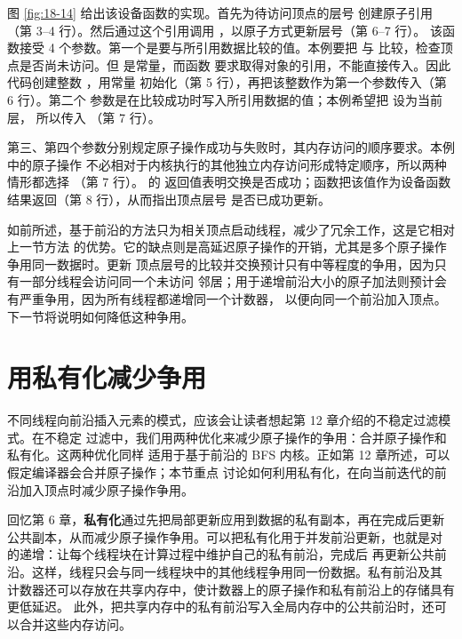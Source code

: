 图 \ref{fig:18-14} 给出该设备函数的实现。首先为待访问顶点的层号
 创建原子引用（第 3--4 行）。然后通过这个引用调用
，以原子方式更新层号（第 6--7 行）。
该函数接受 4 个参数。第一个是要与所引用数据比较的值。本例要把 
与  比较，检查顶点是否尚未访问。但  是常量，而函数
要求取得对象的引用，不能直接传入。因此代码创建整数 ，用常量
 初始化（第 5 行），再把该整数作为第一个参数传入（第 6 行）。第二个
参数是在比较成功时写入所引用数据的值；本例希望把  设为当前层，
所以传入 （第 7 行）。

第三、第四个参数分别规定原子操作成功与失败时，其内存访问的顺序要求。本例中的原子操作
不必相对于内核执行的其他独立内存访问形成特定顺序，所以两种情形都选择
（第 7 行）。 的
返回值表明交换是否成功；函数把该值作为设备函数结果返回（第 8 行），从而指出顶点层号
是否已成功更新。

如前所述，基于前沿的方法只为相关顶点启动线程，减少了冗余工作，这是它相对上一节方法
的优势。它的缺点则是高延迟原子操作的开销，尤其是多个原子操作争用同一数据时。更新
顶点层号的比较并交换预计只有中等程度的争用，因为只有一部分线程会访问同一个未访问
邻居；用于递增前沿大小的原子加法则预计会有严重争用，因为所有线程都递增同一个计数器，
以便向同一个前沿加入顶点。下一节将说明如何降低这种争用。

\section{用私有化减少争用}
\label{sec:bfs-privatization}

不同线程向前沿插入元素的模式，应该会让读者想起第 12 章介绍的不稳定过滤模式。在不稳定
过滤中，我们用两种优化来减少原子操作的争用：合并原子操作和私有化。这两种优化同样
适用于基于前沿的 BFS 内核。正如第 12 章所述，可以假定编译器会合并原子操作；本节重点
讨论如何利用私有化，在向当前迭代的前沿加入顶点时减少原子操作争用。

回忆第 6 章，\textbf{私有化}通过先把局部更新应用到数据的私有副本，再在完成后更新
公共副本，从而减少原子操作争用。可以把私有化用于并发前沿更新，也就是对
 的递增：让每个线程块在计算过程中维护自己的私有前沿，完成后
再更新公共前沿。这样，线程只会与同一线程块中的其他线程争用同一份数据。私有前沿及其
计数器还可以存放在共享内存中，使计数器上的原子操作和私有前沿上的存储具有更低延迟。
此外，把共享内存中的私有前沿写入全局内存中的公共前沿时，还可以合并这些内存访问。

